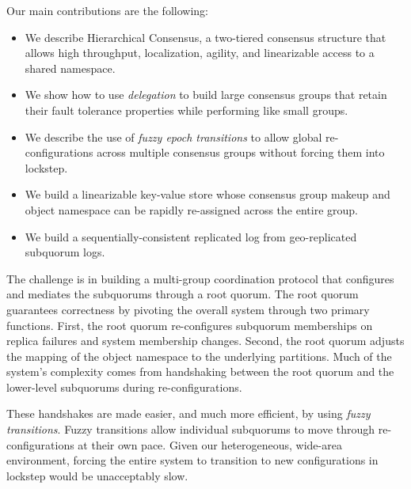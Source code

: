 \documentclass[letterpaper,10pt,twocolumn]{article}
\newcommand{\sub}{subquorum\xspace}
\newcommand{\subs}{subquorums\xspace}
\newcommand{\roo}{root quorum\xspace}
\begin{document}
Our main contributions are the following:
\begin{itemize}
\item We describe Hierarchical Consensus, a two-tiered consensus
  structure that allows high throughput, localization,
  agility, and linearizable access to a shared namespace.
\item We show how to use \emph{delegation} to build large consensus
groups that retain their fault tolerance properties while
performing like small groups.
\item We describe the use of \emph{fuzzy epoch transitions} to allow
  global re-configurations across multiple consensus groups without
  forcing them into lockstep.
\item We build a linearizable key-value store whose consensus group
  makeup and object namespace can be rapidly re-assigned across the
  entire group.
\item We build a sequentially-consistent replicated log from
  geo-replicated \sub logs.
\end{itemize}
The challenge is in building a multi-group coordination protocol that
configures and mediates the \subs through a \roo.
The \roo guarantees correctness by pivoting the overall system through two
primary functions.
First, the \roo re-configures \sub memberships on replica failures and
system membership changes.
Second, the \roo adjusts the mapping of the object namespace to the underlying partitions.
Much of the system's complexity comes from handshaking between the \roo and the
lower-level \subs during re-configurations.

These handshakes are made easier, and much more efficient, by using
\emph{fuzzy transitions}.
Fuzzy transitions allow individual \subs to move through re-configurations at
their own pace.
Given our heterogeneous, wide-area environment, forcing the entire system to
transition to new configurations in lockstep would be unacceptably slow.

%
\end{document}
